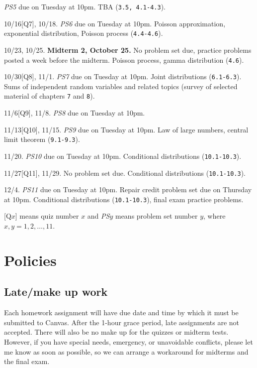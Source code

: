 \documentclass[oneside,11pt]{amsart}
\begin{document}
\begin{enumerate}[\bf{}{[}week 1{]}]
		\emph{PS5} due on Tuesday at 10pm.
		TBA
		(\texttt{3.5, 4.1-4.3}).
	\item 10/16[Q7], 10/18. 
		\emph{PS6} due on Tuesday at 10pm.
		Poisson approximation, exponential distribution, Poisson process
		(\texttt{4.4-4.6}).
	\item 10/23, 10/25. \textbf{Midterm 2, October 25.}
		No problem set due, practice problems posted a week before the midterm.
		Poisson process, gamma distribution (\texttt{4.6}). 
	\item 10/30[Q8], 11/1.
		\emph{PS7} due on Tuesday at 10pm.
		Joint distributions (\texttt{6.1-6.3}).
		Sums of independent random variables and related topics (survey of 
		selected material of chapters \texttt{7} and \texttt{8}).
	\item 11/6[Q9], 11/8.
		\emph{PS8} due on Tuesday at 10pm.
	\item 11/13[Q10], 11/15.
		\emph{PS9} due on Tuesday at 10pm.
		Law of large numbers, central limit theorem (\texttt{9.1-9.3}).
	\item 11/20.
		\emph{PS10} due on Tuesday at 10pm.
		Conditional distributions
		(\texttt{10.1-10.3}).
	\item 11/27[Q11], 11/29.
		No problem set due.
		Conditional distributions (\texttt{10.1-10.3}).
	\item 12/4.
		\emph{PS11} due on Tuesday at 10pm.
		Repair credit problem set due on Thursday at 10pm.
		Conditional distributions (\texttt{10.1-10.3}),
		final exam practice problems.
\end{enumerate}

\bigskip

[Q$x$] means quiz number $x$ and \emph{PS$y$} means problem set number $y$, where $x,y=1,2,\dots,11$.

\section{Policies}

\subsection{Late/make up work} Each homework
assignment will have due date and time by which it must be submitted to Canvas.
After the 1-hour grace period, late assignments are not accepted.
There will also be no make up for the quizzes or midterm tests.
However, if you have special needs, emergency, or unavoidable conflicts, please
let me know as soon as possible, so we can arrange a workaround for midterms and the final exam.
\end{document}
